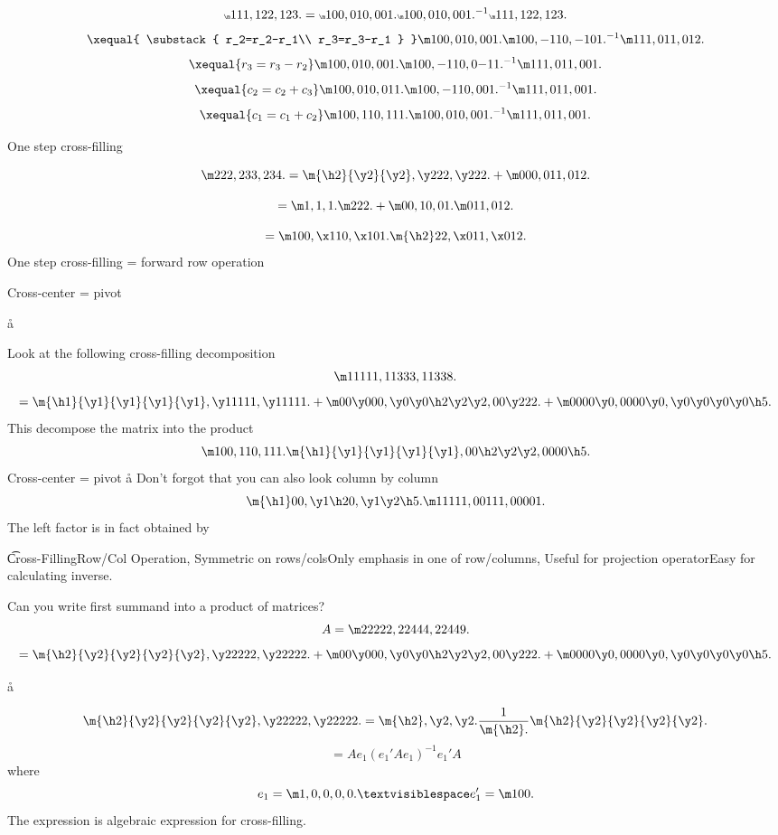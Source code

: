 
$$
\tiny{\m111,122,123. = \m100,010,001. \m100,010,001.^{-1} \m111,122,123.}
$$
$$
\xequal{
\substack{
r_2=r_2-r_1\\
r_3=r_3-r_1
}
}\m100,010,001. \m100,{-1}10,{-1}01.^{-1} \m111,011,012.
$$
$$ \xequal{
r_3=r_3-r_2
}\m100,010,001. \m100,{-1}10,0{-1}1.^{-1} \m111,011,001.  $$
$$ \xequal{
c_2=c_2+c_3
}\m100,010,011. \m100,{-1}10,0{0}1.^{-1} \m111,011,001.  $$
$$ \xequal{
c_1=c_1+c_2
}\m100,110,111. \m100,{0}10,0{0}1.^{-1} \m111,011,001.  $$
\aaa




One step cross-filling

$$
\m 222,233,234. = 
\m{\h2}{\y2}{\y2},{\y2}22,{\y2}22.
 + \m000,011,012.
$$

$$
= \m1,1,1.\m222.+\m00,10,01.\m011,012.
$$

$$
= \m100,{\x1}10,{\x1}01.\m{\h2}22,{\x0}11,{\x0}12.
$$
One step cross-filling = forward row operation

Cross-center = pivot

\a\aa

Look at the following cross-filling decomposition
$$
\m 11111,11333,11338. 
$$
$$= \m{\h1}{\y1}{\y1}{\y1}{\y1},{\y1}1111,{\y1}1111.
+
\m00{\y0}00,{\y0}{\y0}{\h2}{\y2}{\y2},00{\y2}22.
+
\m0000{\y0},0000{\y0},{\y0}{\y0}{\y0}{\y0}{\h5}.
$$
This decompose the matrix into the product
$$
\m100,110,111. \m
{\h1}{\y1}{\y1}{\y1}{\y1},
{0}{0}{\h2}{\y2}{\y2},
0000{\h5}.
$$
Cross-center = pivot
\a\aa
Don't forgot that you can also look column by column
$$
\m{\h1}00,{\y1}{\h2}0,{\y1}{\y2}{\h5}.
\m11111,00111,00001.
$$
The left factor is in fact obtained by 

\t{Cross-Filling}{Row/Col Operation},
{Symmetric on rows/cols}{Only emphasis in one of row/columns},
{Useful for projection operator}{Easy for calculating inverse}.
\aaa




Can you write first summand into a product of matrices?
$$
A=\m 22222,22444,22449. 
$$
$$= \m{\h2}{\y2}{\y2}{\y2}{\y2},{\y2}2222,{\y2}2222.
+
\m00{\y0}00,{\y0}{\y0}{\h2}{\y2}{\y2},00{\y2}22.
+
\m0000{\y0},0000{\y0},{\y0}{\y0}{\y0}{\y0}{\h5}.
$$

\a\aa

$$
\m{\h2}{\y2}{\y2}{\y2}{\y2},{\y2}2222,{\y2}2222.
=
\m{\h2},{\y2},{\y2}.\frac1{\m{\h2}.}\m{\h2}{\y2}{\y2}{\y2}{\y2}.
$$
$$
=Ae_1(e_1'Ae_1)^{-1}e_1'A
$$
where
$$
e_1=\m1,0,0,0,0. ␣ e_1' = \m100.
$$
The expression  is algebraic expression for cross-filling.

